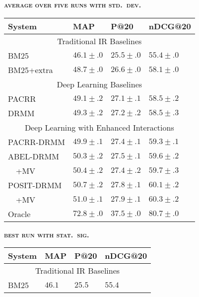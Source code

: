 \documentclass[11pt,a4paper]{article}
\begin{document}
\begin{table*}[t]
\footnotesize
\begin{minipage}{3.15in}
\begin{center}
\textbf{\textsc{{\normalsize average over five runs with std.\ dev.}}}\\
\vspace{0.2em}
\begin{tabular}{|llll|}
\hline
{\bf System}& {\bf MAP}    & {\bf P@20}   & {\bf nDCG@20} \\ \hline
\multicolumn{4}{|c|}{Traditional IR Baselines} \\ \hline
BM25        & $46.1\pm.0$ & $25.5\pm.0$ & $55.4\pm.0$ \\
BM25+extra  & $48.7\pm.0$ & $26.6\pm.0$ & $58.1\pm.0$ \\ \hline
\multicolumn{4}{|c|}{Deep Learning Baselines} \\ \hline
PACRR       & $49.1\pm.2$ & $27.1\pm.1$ & $58.5\pm.2$ \\
DRMM        & $49.3\pm.2$ & $27.2\pm.2$ & $58.5\pm.3$ \\ \hline
\multicolumn{4}{|c|}{Deep Learning with Enhanced Interactions} \\ \hline
PACRR-DRMM  & $49.9\pm.1$ & $27.4\pm.1$ & $59.3\pm.1$ \\
ABEL-DRMM   & $50.3\pm.2$ & $27.5\pm.1$ & $59.6\pm.2$ \\
$\quad$+MV  & $50.4\pm.2$ & $27.4\pm.2$ & $59.7\pm.3$\\
POSIT-DRMM  & $50.7\pm.2$ & $27.8\pm.1$ & $60.1\pm.2$ \\
$\quad$+MV  & $51.0\pm.1$ & $27.9\pm.1$ & $60.3\pm.2$ \\ \hline\hline
Oracle      & $72.8\pm.0$ & $37.5\pm.0$ & $80.7\pm.0$ \\ \hline
\end{tabular}
\end{center}
\end{minipage}
\begin{minipage}{3.1in}
\begin{center}
\textbf{\textsc{{\normalsize best run with stat.\ sig.}}}\\
\vspace{0.2em}
\begin{tabular}{|llll|}
\hline
{\bf System}& {\bf MAP}    & {\bf P@20}   & {\bf nDCG@20} \\ \hline
\multicolumn{4}{|c|}{Traditional IR Baselines} \\ \hline
BM25        & $46.1$ & $25.5$ & $55.4$ \\

\end{tabular}
\end{center}
\end{minipage}
\end{table*}
\end{document}
